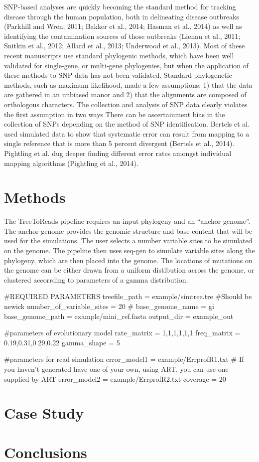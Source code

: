 \documentclass[a4paper,10pt]{article}
\begin{document}
SNP-based analyses are quickly becoming the standard method for tracking disease through the human population, both in delineating disease outbreaks (Parkhill and Wren, 2011; Bakker et al., 2014; Hasman et al., 2014) as well as identifying the contamination sources of those outbreaks (Lienau et al., 2011; Snitkin et al., 2012; Allard et al., 2013; Underwood et al., 2013).
Most of these recent manuscripts use standard phylogenic methods, which have been well validated for single-gene, or multi-gene phylogenies, but when the application of these methods to SNP data has not been validated.
Standard phylogenetic methods, such as maximum likelihood, made a few assumptions: 1) that the data are gathered in an unbiased manor and 2) that the alignments are composed of orthologous characters.
The collection and analysis of SNP data clearly violates the first assumption in two ways There can be ascertainment bias in the collection of SNPs depending on the method of SNP identification. 
Bertels et al. used simulated data to show that systematic error can result from mapping to a single reference that is more than 5 percent divergent (Bertels et al., 2014).
Pightling et al. dug deeper finding different error rates amongst individual mapping algorithms (Pightling et al., 2014). 


\section{Methods}
The TreeToReads pipeline requires an input phylogeny and an ``anchor genome''. 
The anchor genome provides the genomic structure and base content that will be used for the simulations.
The user selects a number variable sites to be simulated on the genome.
The pipeline then uses seq-gen to simulate variable sites along the phylogeny, which are then placed into the genome.
The locations of mutations on the genome can be either drawn from a uniform distibution across the genome, or clustered accorrding to parameters of a gamma distribution.


#REQUIRED PARAMETERS
treefile_path = example/simtree.tre #Should be newick
number_of_variable_sites = 20 #
base_genome_name = gi
base_genome_path = example/mini_ref.fasta
output_dir = example_out


#parameters of evolutionary model
rate_matrix = 1,1,1,1,1,1
freq_matrix =  0.19,0.31,0.29,0.22
gamma_shape = 5

#parameters for read simulation
error_model1 = example/ErrprofR1.txt  # If you haven't generated have one of your own, using ART, you can use one supplied by ART
error_model2 = example/ErrprofR2.txt 
coverage = 20


\section{Case Study}

\section{Conclusions}
\end{document}
